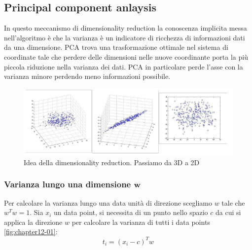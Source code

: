 \subsection{Principal component anlaysis}
In questo meccanismo di dimensionality reduction la conoscenza implicita messa nell'algoritmo \`e che la varianza \`e un indicatore di ricchezza di informazioni dati da una dimensione.
PCA trova una trasformazione ottimale nel sistema di coordinate tale che perdere delle dimensioni nelle nuove coordinante porta la pi\`u piccola riduzione nella varianza dei dati.
PCA in particolare  perde l'asse con la varianza minore perdendo meno informazioni possibile.

\begin{figure}
	\centering
	\includegraphics[width=0.6\linewidth]{imgs/chapter12/img0}
	\caption{Idea della dimensionality reduction. Passiamo da 3D a 2D}
	\label{fig:chapter12-00}
\end{figure}

\subsubsection{Varianza lungo una dimensione $\mathbf{w}$}
Per calcolare la varianza lungo una data unit\`a di direzione scegliamo $w$ tale che $w^Tw=1$.
Sia $x_i$ un data point, si necessita di un punto nello spazio $c$ da cui si applica la direzione $w$ per calcolare la varianza di tutti i data points \ref{fig:chapter12-01}:
$$t_i = (x_i-c)^Tw$$


